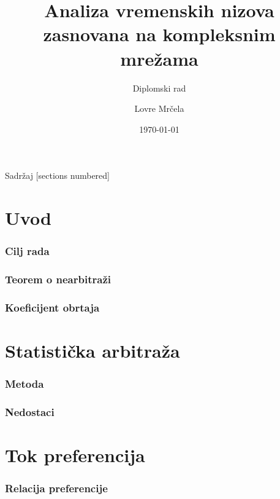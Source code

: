 \documentclass[11pt]{beamer}
\begin{document}
  \author{Lovre Mrčela}
  \title{Analiza vremenskih nizova zasnovana na kompleksnim mrežama}
  \subtitle{Diplomski rad}
  \date{\today}

  \begin{frame}[plain]
  \maketitle
  \end{frame}

  \begin{frame}{Sadržaj}
    [sections numbered]
    \tableofcontents[hideallsubsections]
  \end{frame}
  
  \section{Uvod}
  \begin{frame}
    \frametitle{Cilj rada}
  \end{frame}

  \begin{frame}
    \frametitle{Teorem o nearbitraži}
  \end{frame}

  \begin{frame}
    \frametitle{Koeficijent obrtaja}
  \end{frame}
  
  \section{Statistička arbitraža}
  \begin{frame}
    \frametitle{Metoda}
  \end{frame}

  \begin{frame}
    \frametitle{Nedostaci}
  \end{frame}

  \section{Tok preferencija}
  \begin{frame}
    \frametitle{Relacija preferencije}
  \end{frame}
\end{document}
